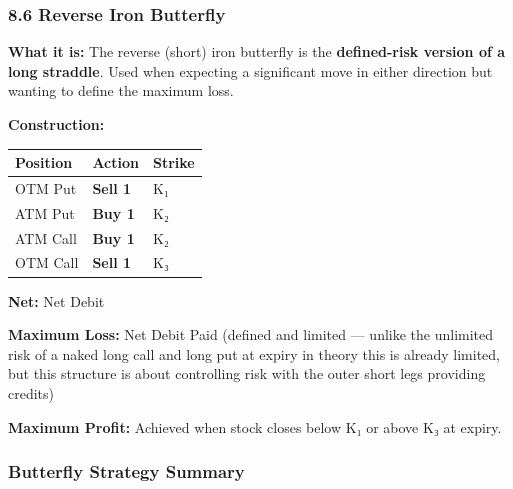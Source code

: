 \documentclass[12pt,openany]{book}
\begin{document}
\subsubsection{8.6 Reverse Iron Butterfly}

\textbf{What it is:} The reverse (short) iron butterfly is the \textbf{defined-risk version of a long straddle}. Used when expecting a significant move in either direction but wanting to define the maximum loss.

\textbf{Construction:}

\begin{center}
\scriptsize
\setlength{\tabcolsep}{3pt}
\begin{tabular}{|L{4.42cm}|L{4.42cm}|L{4.42cm}|}
\hline
Position & Action & Strike \\
\hline
OTM Put & \textbf{Sell 1} & K₁ \\
\hline
ATM Put & \textbf{Buy 1} & K₂ \\
\hline
ATM Call & \textbf{Buy 1} & K₂ \\
\hline
OTM Call & \textbf{Sell 1} & K₃ \\
\hline
\end{tabular}
\end{center}

\textbf{Net:} Net Debit

\textbf{Maximum Loss:} Net Debit Paid (defined and limited — unlike the unlimited risk of a naked long call and long put at expiry in theory this is already limited, but this structure is about controlling risk with the outer short legs providing credits)

\textbf{Maximum Profit:} Achieved when stock closes below K₁ or above K₃ at expiry.



\subsubsection{Butterfly Strategy Summary}
\end{document}
